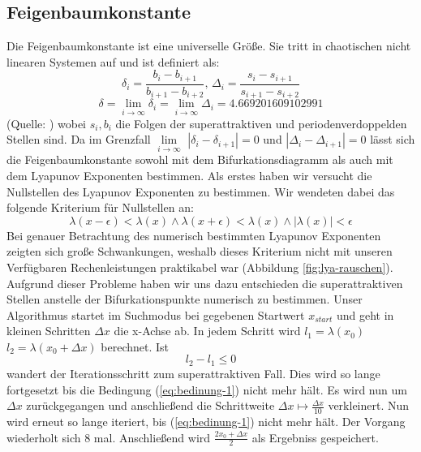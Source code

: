 \documentclass{scrartcl}
\begin{document}
\subsection{Feigenbaumkonstante}
Die Feigenbaumkonstante ist eine universelle Größe. Sie tritt in chaotischen nicht linearen Systemen auf und ist definiert als:
\begin{equation}\delta_i = \frac{b_i-b_{i+1}}{b_{i+1}-b_{i+2}}\text{, }\Delta_i=\frac{s_i-s_{i+1}}{s_{i+1}-s_{i+2}}\end{equation}
\begin{equation}\delta = \lim\limits_{i \rightarrow \infty}{\delta_i}= \lim\limits_{i \rightarrow \infty}{\Delta_i} = 4.669201609102991\end{equation} 
(Quelle: \parencite{feigenbaum})
wobei $s_i, b_i$ die Folgen der superattraktiven und periodenverdoppelden Stellen sind.
Da im Grenzfall $\lim\limits_{i \rightarrow \infty}$ $|\delta_i - \delta_{i+1}|=0$ und $|\Delta_i - \Delta_{i+1}|=0$  lässt sich die Feigenbaumkonstante sowohl mit dem Bifurkationsdiagramm als auch mit dem Lyapunov Exponenten bestimmen. 
Als erstes haben wir versucht die Nullstellen des Lyapunov Exponenten zu bestimmen. Wir wendeten dabei das folgende Kriterium für Nullstellen an:
\begin{equation}
\lambda(x-\epsilon) < \lambda(x) \wedge \lambda(x+\epsilon) < \lambda(x) \wedge |\lambda(x)|<\epsilon
\end{equation}
Bei genauer Betrachtung des numerisch bestimmten Lyapunov Exponenten zeigten sich große Schwankungen, weshalb dieses Kriterium nicht mit unseren Verfügbaren Rechenleistungen praktikabel war (Abbildung \ref{fig:lya-rauschen}).
Aufgrund dieser Probleme
haben wir uns dazu entschieden die superattraktiven Stellen anstelle der Bifurkationspunkte numerisch zu bestimmen. Unser Algorithmus startet im Suchmodus bei gegebenen Startwert $x_{start}$ und geht in kleinen Schritten $\Delta x$ die x-Achse ab. In jedem Schritt wird $l_1=\lambda(x_0)$ $l_2=\lambda(x_0 + \Delta x)$ berechnet. 
Ist
\begin{equation}
l_2-l_1 \leq 0 
\label{eq:bedinung-1}
\end{equation}
wandert der Iterationsschritt zum superattraktiven Fall. 
Dies wird so lange fortgesetzt bis die Bedingung (\ref{eq:bedinung-1}) nicht mehr hält. 
Es wird nun um $\Delta x$ zurückgegangen und anschließend die Schrittweite $\Delta x \mapsto \frac{\Delta x}{10} $ verkleinert. Nun wird erneut so lange iteriert, bis (\ref{eq:bedinung-1}) nicht mehr hält. 
Der Vorgang wiederholt sich 8 mal. Anschließend wird $\frac{2x_0 + \Delta x}{2}$ als Ergebniss gespeichert. 
\end{document}
